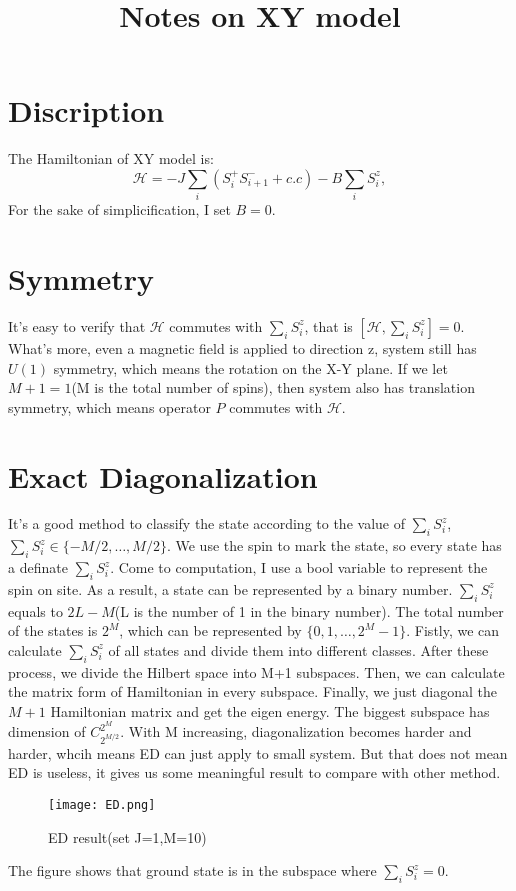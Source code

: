 \documentclass[UTF8]{ctexart}
\title{Notes on XY model}
\begin{document}
\tableofcontents
\maketitle
\section{Discription}
The Hamiltonian of XY model is:
\begin{equation}
\label{1}
\mathcal{H}=-J\sum_{i}(S_i^+S_{i+1}^-+c.c)-B\sum_{i}S_i^z,
\end{equation}
For the sake of simplicification, I set $B=0$.
\section{Symmetry}
It's easy to verify that $\mathcal{H}$ commutes with $\sum_{i}S_i^z$, that is $[\mathcal{H},\sum_{i}S_i^z]=0$. What's more, even a magnetic field is applied to direction z, system still has $U(1)$ symmetry, which means the rotation on the X-Y plane. If we let $M+1=1$(M is the total number of spins), then system also has translation symmetry, which means operator $P$ commutes with $\mathcal{H}$.
\section{Exact Diagonalization}
It's a good method to classify the state according to the value of $\sum_{i}S_i^z$, $\sum_{i}S_i^z\in\{-M/2,\ldots,M/2\}$. We use the spin to mark the state, so every state has a definate $\sum_{i}S_i^z$. Come to computation, I use a bool variable to represent the spin on site. As a result, a state can be represented by a binary number. $\sum_{i}S_i^z$ equals to $2L-M$(L is the number of 1 in the binary number). The total number of the states is $2^M$, which can be represented by $\{0,1,\ldots,2^M-1\}$. Fistly, we can calculate $\sum_{i}S_i^z$ of all states and divide them into different classes. After these process, we divide the Hilbert space into M+1 subspaces. Then, we can calculate the matrix form of Hamiltonian in every subspace. Finally, we just diagonal the $M+1$ Hamiltonian matrix and get the eigen energy. The biggest subspace has dimension of $C^{2^M}_{2^{M/2}}$. With M increasing, diagonalization becomes harder and harder, whcih means ED can just apply to small system. But that does not mean ED is useless, it gives us some meaningful result to compare with other method.
\begin{figure}[H]
	\centering
	\texttt{[image: ED.png]}
	\caption{ED result(set J=1,M=10)}
	\label{fig_1}
\end{figure}
The figure shows that ground state is in the subspace where $\sum_{i}S_i^z=0$.
\end{document}
